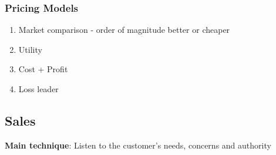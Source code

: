 \documentclass{article}
\begin{document}
\begin{multicols}{2}
\subsubsection{Pricing Models}
\begin{enumerate}
    \item Market comparison - order of magnitude better or cheaper
    \item Utility
    \item Cost + Profit
    \item Loss leader 
\end{enumerate}

\subsection{Sales}
\textbf{Main technique}: Listen to the customer's needs, concerns and authority\\


\end{multicols}
\end{document}
